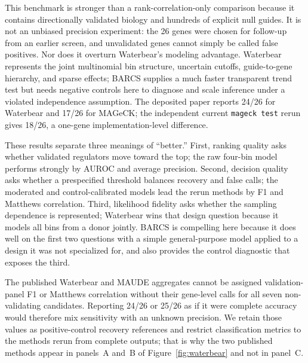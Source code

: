 This benchmark is stronger than a rank-correlation-only comparison because it
contains directionally validated biology and hundreds of explicit null
guides.  It is not an unbiased precision experiment: the 26 genes were chosen
for follow-up from an earlier screen, and unvalidated genes cannot simply be
called false positives.  Nor does it overturn Waterbear's modeling advantage.
Waterbear represents the joint multinomial bin structure, uncertain cutoffs,
guide-to-gene hierarchy, and sparse effects; BARCS supplies
a much faster transparent trend test but needs negative controls here to
diagnose and scale inference under a violated independence assumption.  The deposited paper reports
24/26 for Waterbear and 17/26 for MAGeCK; the independent current
\texttt{mageck test} rerun gives 18/26, a one-gene implementation-level
difference.

These results separate three meanings of ``better.''  First, ranking quality
asks whether validated regulators move toward the top; the raw four-bin model
performs strongly by AUROC and average precision.  Second, decision quality
asks whether a prespecified threshold balances recovery and false calls; the
moderated and control-calibrated models lead the rerun methods by F1 and
Matthews correlation.  Third, likelihood fidelity asks whether the sampling
dependence is represented; Waterbear wins that design question because it
models all bins from a donor jointly.  BARCS is compelling here because it
does well on the first two questions with a simple general-purpose model
applied to a design it was not specialized for, and also provides the control
diagnostic that exposes the third.

The published Waterbear and MAUDE aggregates cannot be assigned validation-
panel F1 or Matthews correlation without their gene-level calls for all seven
non-validating candidates.  Reporting 24/26 or 25/26 as if it were complete
accuracy would therefore mix sensitivity with an unknown precision.  We retain
those values as positive-control recovery references and restrict
classification metrics to the methods rerun from complete outputs; that is why
the two published methods appear in panels~A and~B of
Figure~\ref{fig:waterbear} and not in panel~C.

